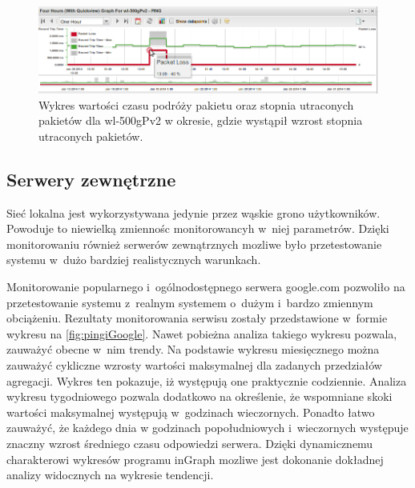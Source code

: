\begin{figure}[ht]
  \caption{Wykres wartości czasu podróży pakietu oraz stopnia
    utraconych pakietów dla wl-500gPv2 w okresie, gdzie wystąpił wzrost stopnia utraconych pakietów.}
  \label{fig:pingRouteraDokladny}
  \centering
\includegraphics[width=1\textwidth]{img/pingiRouterDokladny.png}
\end{figure}

\subsection[Serwery zewnętrzne][Serwery zewnętrzne]{Serwery zewnętrzne}

Sieć lokalna jest wykorzystywana jedynie przez wąskie grono
użytkowników. Powoduje to niewielką zmiennośc monitorowancyh w~niej
parametrów. Dzięki monitorowaniu również serwerów zewnątrznych mozliwe
było przetestowanie systemu w~dużo bardziej realistycznych warunkach.

Monitorowanie popularnego i~ogólnodostępnego serwera google.com
pozwoliło na przetestowanie systemu z~realnym systemem o~dużym
i~bardzo zmiennym obciążeniu. Rezultaty monitorowania serwisu zostały
przedstawione w~formie wykresu na \ref{fig:pingiGoogle}. Nawet
pobieżna analiza takiego wykresu pozwala, zauważyć obecne w~nim
trendy. Na podstawie wykresu miesięcznego można zauważyć cykliczne
wzrosty wartości maksymalnej dla zadanych przedziałów
agregacji. Wykres ten pokazuje, iż występują one praktycznie
codziennie. Analiza wykresu tygodniowego pozwala dodatkowo na
określenie, że wspomniane skoki wartości maksymalnej występują
w~godzinach wieczornych. Ponadto łatwo zauważyć, że każdego dnia w
godzinach popołudniowych i~wieczornych występuje znaczny wzrost
średniego czasu odpowiedzi serwera. Dzięki dynamicznemu charakterowi
wykresów programu inGraph mozliwe jest dokonanie dokładnej analizy
widocznych na wykresie tendencji.

